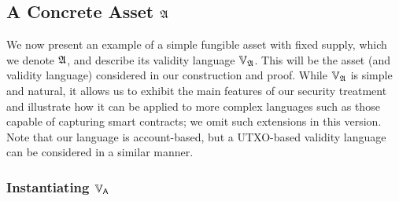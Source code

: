\subsection{A Concrete Asset $\mathfrak{A}$}
\label{sec:inst}

We now present an example of a simple fungible asset with fixed supply, which we
denote $\mathfrak{A}$, and describe its validity language $\mathbb{V}_{\mathfrak{A}}$.
This will be the asset (and validity language) considered in our construction
and proof. While $\mathbb{V}_{\mathfrak{A}}$ is simple and natural, it
allows us to exhibit the main features of our security treatment and illustrate
how  it can be applied to more complex languages such as those capable
of capturing smart contracts; we omit such extensions in this version.
Note that our language is account-based, but a UTXO-based validity
language can be considered in a similar manner.

\subsubsection{Instantiating $\mathbb{V}_{\mathsf{A}}$}
\label{sec:inst-vallang}

